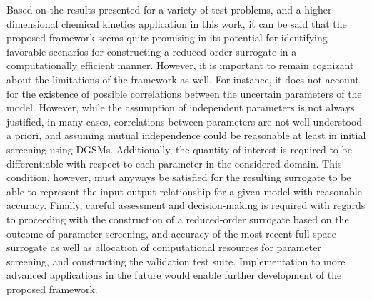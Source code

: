 Based on the results presented for a variety of test problems, and a
higher-dimensional chemical kinetics application in this work, it can be said
that the proposed framework seems quite promising in its potential for
identifying favorable scenarios for constructing a reduced-order surrogate in a
computationally efficient manner.  However, it is important to remain cognizant
about the limitations of the framework as well. For instance, it does not
account for the existence of possible correlations between the uncertain
parameters of the model. However, while the assumption of independent
parameters is not always justified, in many cases, correlations between
parameters are not well understood a priori, and assuming mutual independence
could be reasonable at least in initial screening using DGSMs.
Additionally, the quantity of interest is required to be differentiable with
respect to each parameter in the considered domain. This condition, however,
must anyways be satisfied for the resulting surrogate to be able to represent
the input-output relationship for a given model with reasonable accuracy.
Finally, careful assessment and decision-making is required with regards to
proceeding with the construction of a reduced-order surrogate based on the
outcome of parameter screening, and accuracy of the most-recent full-space
surrogate as well as allocation of computational resources for parameter
screening, and constructing the validation test suite. Implementation to more
advanced applications in the future would enable further development of the
proposed framework. 

















